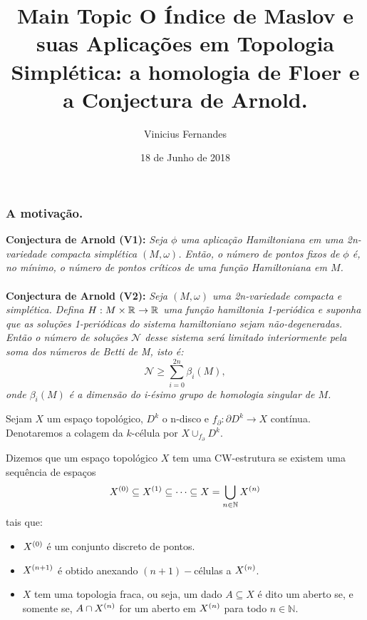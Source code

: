 \documentclass{beamer}
\title[Short title]{Main Topic } %
\author{Vinicius Fernandes}
\title{O Índice de Maslov e suas Aplicações em Topologia Simplética: a homologia de Floer e a Conjectura de Arnold.}
\institute{Universidade Federal do ABC}
\date{18 de Junho de 2018}
\begin{document}
	
	\begin{frame}
		\titlepage %
	\end{frame}
	
	\begin{frame}
		\frametitle{
			A motivação.}
		\textbf{Conjectura de Arnold (V1):} \textit{Seja $\phi$ uma aplicação Hamiltoniana em uma 2n-variedade compacta simplética $(M, \omega)$. Então, o número de pontos fixos de $\phi$ é, no mínimo, o número de pontos críticos de uma função Hamiltoniana em $M$.}
		\\~\\
		
		\pause	
		\textbf{Conjectura de Arnold (V2):} \textit	{Seja $(M,\omega)$ uma 2n-variedade compacta e simplética. Defina  $H:M\times \mathbb{R}^{} \to \mathbb{R}^{}$  uma função hamiltonia 1-periódica e suponha que as soluções 1-periódicas do sistema hamiltoniano sejam não-degeneradas. Então o número de soluções $\mathcal{N}$ desse sistema será limitado interiormente pela soma dos números de Betti de M, isto é:
			$$
			\mathcal{N}\geq \sum_{i=0}^{2n}\beta_{i}(M),
			$$
			onde $\beta_{i}(M)$ é a dimensão do i-ésimo grupo de homologia singular de $M$.}
	\end{frame}
	
	\begin{frame}
		
		\begin{definicao}
			Sejam $X$ um espaço topológico, $D^{k}$ o n-disco e $f_{\partial}:\partial D^{k} \to X$ contínua. Denotaremos a colagem da $k$-célula por $X\cup_{f_{\partial}}D^{k}$.
		\end{definicao}
		
		\begin{definicao}[CW-complexo]
			Dizemos que um espaço topológico $X$ tem uma CW-estrutura se existem uma sequência de espaços
			$$
			X^{(0)} \subseteq X^{(1)} \subseteq \dots \subseteq X = \bigcup \limits_{n\in \mathbb{N}} X^{(n)}
			$$ 
			tais que:
			\begin{itemize}
				\item $X^{(0)}$ é um conjunto discreto de pontos.
				
				\item $X^{(n+1)}$ é obtido anexando $(n+1)-$células a $X^{(n)}$.
				
				\item $X$ tem uma topologia fraca, ou seja, um dado $A \subseteq X$ é dito um aberto se, e somente se, $A \cap X^{(n)}$ for um aberto em $X^{(n)}$ para todo $n \in \mathbb{N}$.
			\end{itemize}
		\end{definicao}
	\end{frame}
	
\end{document}
